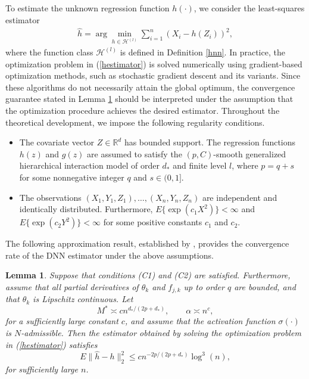 \documentclass[12pt,reqno,oneside]{amsbook}
\newtheorem{lemma}[theorem]{Lemma}
\theoremstyle{definition}
\theoremstyle{remark}
\begin{document}
To estimate the unknown regression function $h(\cdot)$, we consider the least-squares estimator
\begin{align}
\label{hestimator}
\hat{h}
=
\arg\min_{h\in\mathcal{H}^{(l)}}
\sum_{i=1}^n
\left(X_i-h(Z_i)\right)^2,
\end{align}
where the function class $\mathcal{H}^{(l)}$ is defined in Definition \ref{hnn}. In practice, the optimization problem in (\ref{hestimator}) is solved numerically using gradient-based optimization methods, such as stochastic gradient descent and its variants. Since these algorithms do not necessarily attain the global optimum, the convergence guarantee stated in Lemma \ref{lemma1} should be interpreted under the assumption that the optimization procedure achieves the desired estimator. Throughout the theoretical development, we impose the following regularity conditions.

\begin{itemize}

\item[(C1)]
The covariate vector $Z\in\mathbb{R}^d$ has bounded support. The regression functions
$h(z)$
and
$g(z)$
are assumed to satisfy the $(p,C)$-smooth generalized hierarchical interaction model of order $d_*$ and finite level $l$, where $p=q+s$ for some nonnegative integer $q$ and $s\in(0,1]$.

\item[(C2)]
The observations
$(X_1,Y_1,Z_1),\ldots,(X_n,Y_n,Z_n)$
are independent and identically distributed. Furthermore,
$E\{\exp(c_1X^2)\}<\infty$
and
$E\{\exp(c_2Y^2)\}<\infty$
for some positive constants
$c_1$
and
$c_2$.

\end{itemize}

The following approximation result, established by \cite{Bauer2019}, provides the convergence rate of the DNN estimator under the above assumptions.

\begin{lemma}
\label{lemma1}
Suppose that conditions (C1) and (C2) are satisfied. Furthermore, assume that all partial derivatives of $\theta_k$ and $f_{j,k}$ up to order $q$ are bounded, and that $\theta_k$ is Lipschitz continuous. Let
\[
M^*\asymp c n^{d_*/(2p+d_*)}, \qquad
\alpha\asymp n^c,
\]
for a sufficiently large constant $c$, and assume that the activation function $\sigma(\cdot)$ is $N$-admissible. Then the estimator obtained by solving the optimization problem in (\ref{hestimator}) satisfies
\[
E\|\hat{h}-h\|_2^2
\leq
c n^{-2p/(2p+d_*)}\log^3(n),
\]
for sufficiently large $n$.
\end{lemma}
\end{document}
